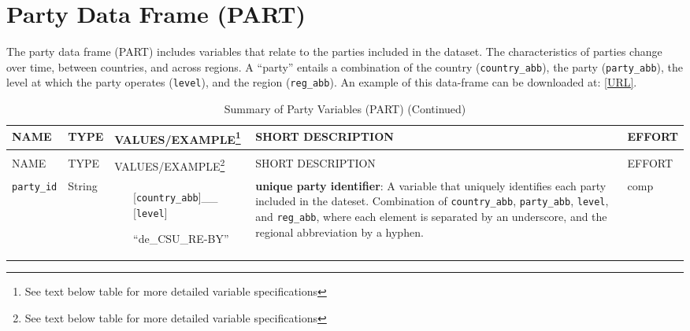 \documentclass{article}
\begin{document}
\section{Party Data Frame (\gls{PART})}\label{PART}
The party data frame (\gls{PART}) includes variables that relate to the parties included in the dataset. The characteristics of parties change over time, between countries, and across regions. A ``party'' entails a combination of the country (\texttt{country\_abb}), the party (\texttt{party\_abb}), the level at which the party operates (\texttt{level}), and the region (\texttt{reg\_abb}). An example of this data-frame can be downloaded at: \url{[URL]}.


    \begin{longtable}[H!]
        {|m{}|
          m{}|
          m{}| 
          m{}|
          m{}|} 

\caption{Summary of Party Variables (\gls{PART})}
\label{PARTtab}

 \\\hline NAME & TYPE & VALUES/EXAMPLE\footnote{See text below table for more detailed variable specifications} & SHORT DESCRIPTION & EFFORT \\ \hline
\endfirsthead

\caption[]{Summary of Party Variables (\gls{PART}) (Continued)}
\\\hline NAME & TYPE & VALUES/EXAMPLE\footnote{See text below table for more detailed variable specifications} & SHORT DESCRIPTION & EFFORT \\ \hline
\endhead
         \texttt{party\_id}
         &
    String
         & 
    \begin{itemize}
    \item [][\texttt{country\_abb}]\_\_
    [\texttt{level}]\-
    \item []``\gls{de}\_CSU\_RE-BY''
    \end{itemize}
   

     &
    \textbf{unique party identifier}: A variable that uniquely identifies each party included in the dateset. Combination of \texttt{country\_abb}, \texttt{party\_abb}, \texttt{level}, and \texttt{reg\_abb}, where each element is separated by an underscore, and the regional abbreviation by a hyphen.
     &
    \gls{comp} &
    

\end{longtable}
\end{document}
